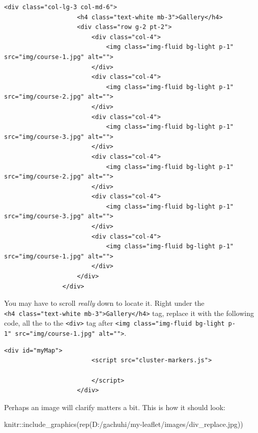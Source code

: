 \documentclass[
]{book}
\newenvironment{Shaded}{\begin{snugshade}}{\end{snugshade}}
\newcommand{\FunctionTok}[1]{\textcolor[rgb]{0.00,0.00,0.00}{#1}}
\newcommand{\NormalTok}[1]{#1}
\newcommand{\SpecialCharTok}[1]{\textcolor[rgb]{0.00,0.00,0.00}{#1}}
\newcommand{\StringTok}[1]{\textcolor[rgb]{0.31,0.60,0.02}{#1}}
\begin{document}
\begin{verbatim}
<div class="col-lg-3 col-md-6">
                    <h4 class="text-white mb-3">Gallery</h4>
                    <div class="row g-2 pt-2">
                        <div class="col-4">
                            <img class="img-fluid bg-light p-1" src="img/course-1.jpg" alt="">
                        </div>
                        <div class="col-4">
                            <img class="img-fluid bg-light p-1" src="img/course-2.jpg" alt="">
                        </div>
                        <div class="col-4">
                            <img class="img-fluid bg-light p-1" src="img/course-3.jpg" alt="">
                        </div>
                        <div class="col-4">
                            <img class="img-fluid bg-light p-1" src="img/course-2.jpg" alt="">
                        </div>
                        <div class="col-4">
                            <img class="img-fluid bg-light p-1" src="img/course-3.jpg" alt="">
                        </div>
                        <div class="col-4">
                            <img class="img-fluid bg-light p-1" src="img/course-1.jpg" alt="">
                        </div>
                    </div>
                </div>
\end{verbatim}

You may have to scroll \emph{really} down to locate it. Right under the \texttt{\textless{}h4\ class="text-white\ mb-3"\textgreater{}Gallery\textless{}/h4\textgreater{}} tag, replace it with the following code, all the to the \texttt{\textless{}div\textgreater{}} tag after \texttt{\textless{}img\ class="img-fluid\ bg-light\ p-1"\ src="img/course-1.jpg"\ alt=""\textgreater{}}.

\begin{verbatim}
<div id="myMap"> 
                        <script src="cluster-markers.js">

                        </script>
                    </div>
\end{verbatim}

Perhaps an image will clarify matters a bit. This is how it should look:

\begin{Shaded}
\begin{Highlighting}[]
\NormalTok{knitr}\SpecialCharTok{::}\FunctionTok{include\_graphics}\NormalTok{(}\FunctionTok{rep}\NormalTok{(}\StringTok{\textquotesingle{}D:/gachuhi/my{-}leaflet/images/div\_replace.jpg\textquotesingle{}}\NormalTok{))}
\end{Highlighting}
\end{Shaded}
\end{document}
